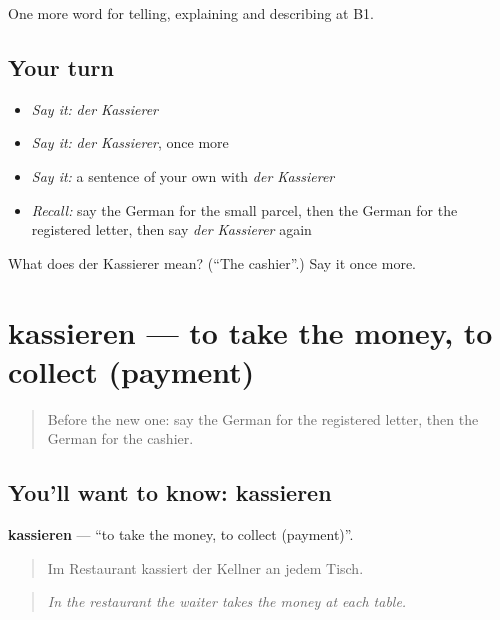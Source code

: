 \begin{grammarlens}[title={What you've built}]
One more word for telling, explaining and describing at B1.
\end{grammarlens}

\subsection*{Your turn}
\begin{itemize}
\raggedright
  \item \emph{Say it:} \emph{der Kassierer}
  \item \emph{Say it:} \emph{der Kassierer}, once more
  \item \emph{Say it:} a sentence of your own with \emph{der Kassierer}
  \item \emph{Recall:} say the German for the small parcel, then the German for the registered letter, then say \emph{der Kassierer} again
\end{itemize}

\begin{tcolorbox}[breakable,colback=teal!4,colframe=teal!35!black,title={Before you move on}]
What does der Kassierer mean? (\textquotedblleft{}The cashier\textquotedblright{}.) Say it once more.
\end{tcolorbox}
\section[kassieren]{kassieren — to take the money, to collect (payment)}

\label{lesson:GE-C449-kassieren}



\begin{quote}
Before the new one: say the German for the registered letter, then the German for the cashier.
\end{quote}

\subsection*{You'll want to know: kassieren}
\textbf{kassieren} — \textquotedblleft{}to take the money, to collect (payment)\textquotedblright{}.

\begin{quote}
Im Restaurant kassiert der Kellner an jedem Tisch.
\end{quote}

\begin{quote}
\emph{In the restaurant the waiter takes the money at each table.}
\end{quote}

